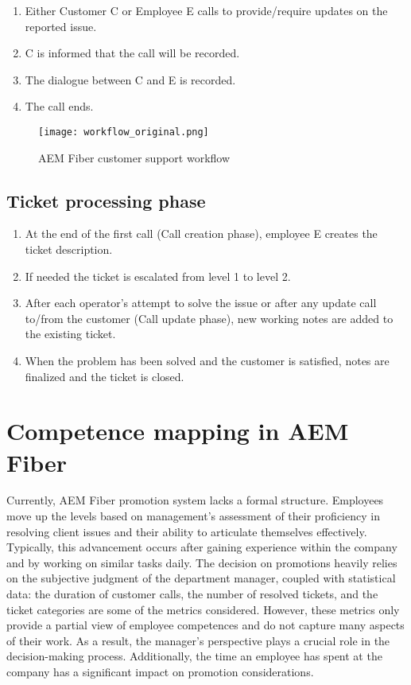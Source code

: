 \begin{enumerate}
      \item Either Customer C or Employee E calls to provide/require updates on the reported issue.
      \item C is informed that the call will be recorded.
      \item The dialogue between C and E is recorded.
      \item The call ends.
\end{enumerate}

\begin{center}
      \begin{figure}[ht]
            \centering
            \texttt{[image: workflow\_original.png]}
            \caption[short]{AEM Fiber customer support workflow}
            \label{fig:aemfiberworkfloworiginal}
      \end{figure}
\end{center}

\subsection*{Ticket processing phase}

\begin{enumerate}
      \item At the end of the first call (Call creation phase), employee E creates the ticket description.
      \item If needed the ticket is escalated from level 1 to level 2.
      \item After each operator's attempt to solve the issue or after any update call to/from the customer (Call update phase), new working notes are added to the existing ticket.
      \item When the problem has been solved and the customer is satisfied, notes are finalized and the ticket is closed.
\end{enumerate}

\section{Competence mapping in AEM Fiber}

Currently, AEM Fiber promotion system lacks a formal structure. Employees move up the levels based on management's assessment of their proficiency in resolving client issues and their ability to articulate themselves effectively. Typically, this advancement occurs after gaining experience within the company and by working on similar tasks daily. The decision on promotions heavily relies on the subjective judgment of the department manager, coupled with statistical data: the duration of customer calls, the number of resolved tickets, and the ticket categories are some of the metrics considered. However, these metrics only provide a partial view of employee competences and do not capture many aspects of their work. As a result, the manager's perspective plays a crucial role in the decision-making process. Additionally, the time an employee has spent at the company has a significant impact on promotion considerations.\\

